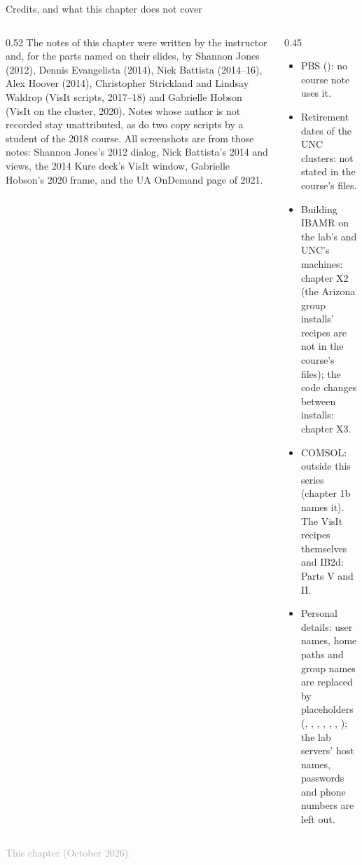 \documentclass[aspectratio=169,11pt]{beamer}
\newcommand{\sourcecredit}[1]{\vfill\begin{flushright}\tiny\textcolor{DarkGray}{#1}\end{flushright}}
\begin{document}
\begin{frame}{Credits, and what this chapter does not cover}
\label{fr:credits}
\begin{columns}[T,onlytextwidth]
\begin{column}{0.52\textwidth}
\footnotesize {} The notes of this chapter were written by the instructor and, for the parts named on their slides, by Shannon Jones (2012), Dennis Evangelista (2014), Nick Battista (2014--16), Alex Hoover (2014), Christopher Strickland and Lindsay Waldrop (VisIt scripts, 2017--18) and Gabrielle Hobson (VisIt on the cluster, 2020). Notes whose author is not recorded stay unattributed, as do two copy scripts by a student of the 2018 course. All screenshots are from those notes: Shannon Jones's 2012 dialog, Nick Battista's 2014  and  views, the 2014 Kure deck's VisIt window, Gabrielle Hobson's 2020 frame, and the UA OnDemand page of 2021.
\end{column}
\begin{column}{0.45\textwidth}
\footnotesize {}\scriptsize
\begin{itemize}\setlength{\itemsep}{2pt}
  \item PBS (): no course note uses it.
  \item Retirement dates of the UNC clusters: not stated in the course's files.
  \item Building IBAMR on the lab's and UNC's machines: chapter X2 (the Arizona group installs' recipes are not in the course's files); the code changes between installs: chapter X3.
  \item COMSOL: outside this series (chapter 1b names it). The VisIt recipes themselves and IB2d: Parts V and II.
  \item Personal details: user names, home paths and group names are replaced by placeholders (, , , , , , ); the lab servers' host names, passwords and phone numbers are left out.
\end{itemize}
\end{column}
\end{columns}
\sourcecredit{This chapter (October 2026).}
\end{frame}
\end{document}
